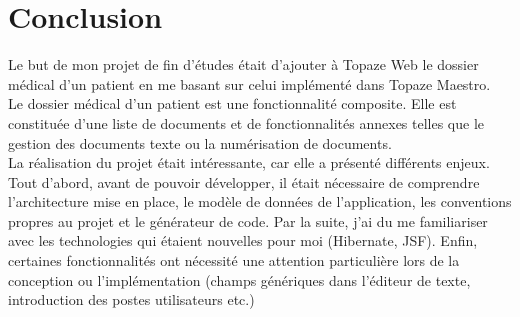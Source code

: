 \newpage
\section*{Conclusion} %

Le but de mon projet de fin d'études était d'ajouter à Topaze Web le dossier médical d'un patient en me basant sur celui implémenté dans Topaze Maestro.\\
Le dossier médical d'un patient est une fonctionnalité composite. Elle est constituée d'une liste de documents et de fonctionnalités annexes telles que le gestion des documents texte ou la numérisation de documents.\\

La réalisation du projet était intéressante, car elle a présenté différents enjeux. Tout d'abord, avant de pouvoir développer, il était nécessaire de comprendre l'architecture mise en place, le modèle de données de l'application, les conventions propres au projet et le générateur de code. Par la suite, j'ai du me familiariser avec les technologies qui étaient nouvelles pour moi (Hibernate, JSF). Enfin, certaines fonctionnalités ont nécessité une attention particulière lors de la conception ou l'implémentation (champs génériques dans l'éditeur de texte, introduction des postes utilisateurs etc.)\\


